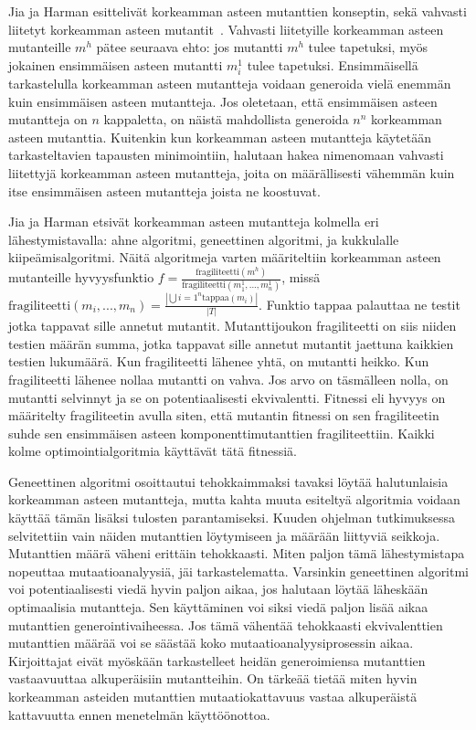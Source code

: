 \documentclass[finnish]{tktltiki2}
\begin{document}
Jia ja Harman esittelivät korkeamman asteen mutanttien konseptin, sekä vahvasti liitetyt korkeamman asteen mutantit~\cite{JiaH08b}. Vahvasti liitetyille korkeamman asteen mutanteille $m^h$ pätee seuraava ehto: jos mutantti $m^h$ tulee tapetuksi, myös jokainen ensimmäisen asteen mutantti $m^1_i$ tulee tapetuksi. Ensimmäisellä tarkastelulla korkeamman asteen mutantteja voidaan generoida vielä enemmän kuin ensimmäisen asteen mutantteja. Jos oletetaan, että ensimmäisen asteen mutantteja on $n$ kappaletta, on näistä mahdollista generoida $n^n$ korkeamman asteen mutanttia. Kuitenkin kun korkeamman asteen mutantteja käytetään tarkasteltavien tapausten minimointiin, halutaan hakea nimenomaan vahvasti liitettyjä korkeamman asteen mutantteja, joita on määrällisesti vähemmän kuin itse ensimmäisen asteen mutantteja joista ne koostuvat. 

Jia ja Harman etsivät korkeamman asteen mutantteja kolmella eri lähestymistavalla: ahne algoritmi, geneettinen algoritmi, ja kukkulalle kiipeämisalgoritmi. Näitä algoritmeja varten määriteltiin korkeamman asteen mutanteille hyvyysfunktio $f = \frac{\text{fragiliteetti}({m^h})}{\text{fragiliteetti}({m^1_1, ..., m^1_n})}$, missä $\text{fragiliteetti}(m_i, ..., m_n) = \frac{|\bigcup{i=1}^{n} \text{tappaa}(m_i)|}{|T|}$. Funktio $\text{tappaa}$ palauttaa ne testit jotka tappavat sille annetut mutantit. Mutanttijoukon fragiliteetti on siis niiden testien määrän summa, jotka tappavat sille annetut mutantit jaettuna kaikkien testien lukumäärä. Kun fragiliteetti lähenee yhtä, on mutantti heikko. Kun fragiliteetti lähenee nollaa mutantti on vahva. Jos arvo on täsmälleen nolla, on mutantti selvinnyt ja se on potentiaalisesti ekvivalentti. Fitnessi eli hyvyys on määritelty fragiliteetin avulla siten, että mutantin fitnessi on sen fragiliteetin suhde sen ensimmäisen asteen komponenttimutanttien fragiliteettiin. Kaikki kolme optimointialgoritmia käyttävät tätä fitnessiä. 

Geneettinen algoritmi osoittautui tehokkaimmaksi tavaksi löytää halutunlaisia korkeamman asteen mutantteja, mutta kahta muuta esiteltyä algoritmia voidaan käyttää tämän lisäksi tulosten parantamiseksi. Kuuden ohjelman tutkimuksessa selvitettiin vain näiden mutanttien löytymiseen ja määrään liittyviä seikkoja. Mutanttien määrä väheni erittäin tehokkaasti. Miten paljon tämä lähestymistapa nopeuttaa mutaatioanalyysiä, jäi tarkastelematta. Varsinkin geneettinen algoritmi voi potentiaalisesti viedä hyvin paljon aikaa, jos halutaan löytää läheskään optimaalisia mutantteja. Sen käyttäminen voi siksi viedä paljon lisää aikaa mutanttien generointivaiheessa. Jos tämä vähentää tehokkaasti ekvivalenttien mutanttien määrää voi se säästää koko mutaatioanalyysiprosessin aikaa. Kirjoittajat eivät myöskään tarkastelleet heidän generoimiensa mutanttien vastaavuuttaa alkuperäisiin mutantteihin. On tärkeää tietää miten hyvin korkeamman asteiden mutanttien mutaatiokattavuus vastaa alkuperäistä kattavuutta ennen menetelmän käyttöönottoa.
\end{document}
